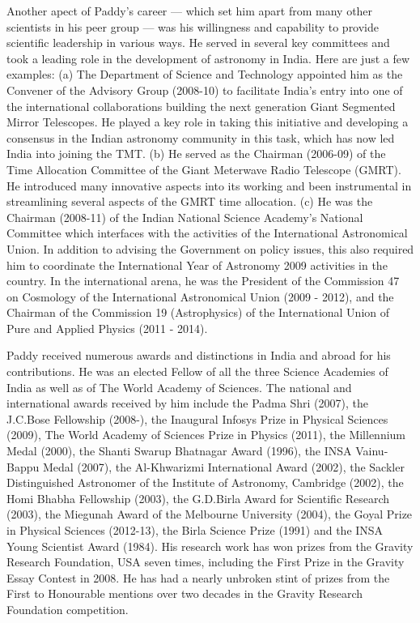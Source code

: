 \documentclass[prd, preprint, longbibliography, 11pt]{revtex4-1}
\begin{document}
Another apect of Paddy's career — which  set him apart from many other
scientists in his peer group — was his willingness and capability to
provide scientific leadership in various ways.
He served in several key committees and took a leading role in the
development of astronomy in India.
Here are just a few examples: (a) The Department of Science and
Technology appointed him as the Convener of the Advisory Group
(2008-10) to facilitate India’s entry into one of the international
collaborations building the next generation Giant Segmented Mirror
Telescopes. He played a key role in taking this initiative and
developing a consensus in the Indian astronomy community in this task,
which has now led India into joining the TMT. (b) He served as the
Chairman (2006-09) of the Time Allocation Committee of the Giant
Meterwave Radio Telescope (GMRT).  He introduced many innovative
aspects into its working and been instrumental in streamlining several
aspects of the GMRT time allocation. (c) He was the Chairman (2008-11)
of the Indian National Science Academy’s National Committee which
interfaces with the activities of the International Astronomical
Union. In addition to advising the Government on policy issues, this
also required him to coordinate the International Year of Astronomy
2009 activities in the country.
In the international arena, he was the President of the Commission 47
on Cosmology of the International Astronomical Union (2009 - 2012),
and the Chairman of the Commission 19 (Astrophysics) of the
International Union of Pure and Applied Physics (2011 - 2014).

Paddy received numerous awards and distinctions in
India and abroad for his contributions.
He was an elected Fellow of all the three Science Academies of India
as well as of The World Academy of Sciences. The national and
international awards received by him include the Padma Shri (2007),
the J.C.Bose Fellowship (2008-), the Inaugural Infosys Prize in
Physical Sciences (2009), The World Academy of Sciences Prize in
Physics (2011), the Millennium Medal (2000), the Shanti Swarup
Bhatnagar Award (1996), the INSA Vainu-Bappu Medal (2007), the
Al-Khwarizmi International Award (2002), the Sackler Distinguished
Astronomer of the  Institute of Astronomy, Cambridge (2002), the Homi
Bhabha Fellowship (2003), the G.D.Birla Award for Scientific Research
(2003), the Miegunah Award of the Melbourne University (2004), the
Goyal Prize in Physical Sciences (2012-13), the Birla Science Prize
(1991) and the INSA Young Scientist Award (1984).
His research work has won  prizes from the Gravity Research
Foundation, USA seven times, including the First Prize in the Gravity
Essay Contest in  2008.
He has had a nearly unbroken stint of prizes from the First to
Honourable mentions over two decades in the Gravity Research
Foundation competition. 
\end{document}
